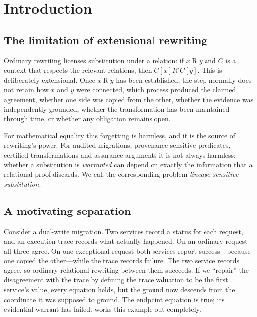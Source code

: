 \section{Introduction}\label{sec:intro}

\subsection{The limitation of extensional rewriting}
Ordinary rewriting licenses substitution under a relation: if $x \mathrel{R} y$ and $C$ is a context that respects the relevant relations, then $C[x] \mathrel{R'} C[y]$. This is deliberately extensional. Once $x \mathrel{R} y$ has been established, the step normally does not retain how $x$ and $y$ were connected, which process produced the claimed agreement, whether one side was copied from the other, whether the evidence was independently grounded, whether the transformation has been maintained through time, or whether any obligation remains open.

For mathematical equality this forgetting is harmless, and it is the source of rewriting's power. For audited migrations, provenance-sensitive predicates, certified transformations and assurance arguments it is not always harmless: whether a substitution is \emph{warranted} can depend on exactly the information that a relational proof discards. We call the corresponding problem \emph{lineage-sensitive substitution}.

\subsection{A motivating separation}
Consider a dual-write migration. Two services record a status for each request, and an execution trace records what actually happened. On an ordinary request all three agree. On one exceptional request both services report success---because one copied the other---while the trace records failure. The two service records agree, so ordinary relational rewriting between them succeeds. If we ``repair'' the disagreement with the trace by defining the trace valuation to be the first service's value, every equation holds, but the ground now descends from the coordinate it was supposed to ground. The endpoint equation is true; its evidential warrant has failed.  works this example out completely.

